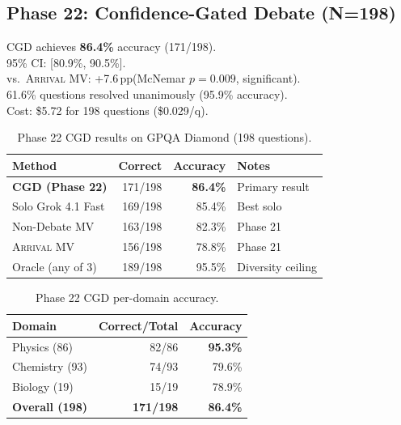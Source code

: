 \documentclass[11pt,a4paper]{article}
\newcommand{\arrival}{\textsc{Arrival}\xspace}
\newcommand{\cgd}{\textsc{CGD}\xspace}
\newcommand{\pp}{\,pp\xspace}
\begin{document}
\subsection{Phase 22: Confidence-Gated Debate (N=198)}

\begin{resultbox}
\cgd achieves \textbf{86.4\%} accuracy (171/198).\\
95\% CI: [80.9\%, 90.5\%].\\
vs.\ \arrival MV: +7.6\pp (McNemar $p=0.009$, significant).\\
61.6\% questions resolved unanimously (95.9\% accuracy).\\
Cost: \$5.72 for 198 questions (\$0.029/q).
\end{resultbox}

\begin{table}[H]
\centering\small
\caption{Phase 22 CGD results on GPQA Diamond (198 questions).}\label{tab:cgd3}
\begin{tabular}{@{}lrrl@{}}
\toprule
\textbf{Method} & \textbf{Correct} & \textbf{Accuracy} & \textbf{Notes} \\
\midrule
\textbf{CGD (Phase 22)}   & 171/198 & \textbf{86.4\%} & Primary result \\
Solo Grok 4.1 Fast        & 169/198 & 85.4\%           & Best solo \\
Non-Debate MV             & 163/198 & 82.3\%           & Phase 21 \\
\arrival MV               & 156/198 & 78.8\%           & Phase 21 \\
Oracle (any of 3)         & 189/198 & 95.5\%           & Diversity ceiling \\
\bottomrule
\end{tabular}
\end{table}

\begin{table}[H]
\centering\small
\caption{Phase 22 CGD per-domain accuracy.}\label{tab:cgddomain}
\begin{tabular}{@{}lrr@{}}
\toprule
\textbf{Domain} & \textbf{Correct/Total} & \textbf{Accuracy} \\
\midrule
Physics (86)   & 82/86  & \textbf{95.3\%} \\
Chemistry (93) & 74/93  & 79.6\% \\
Biology (19)   & 15/19  & 78.9\% \\
\midrule
\textbf{Overall (198)} & \textbf{171/198} & \textbf{86.4\%} \\
\bottomrule
\end{tabular}
\end{table}
\end{document}
